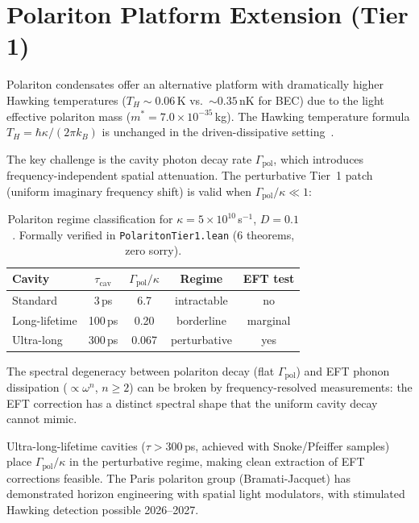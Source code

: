 \documentclass[aps,prd,twocolumn,showpacs,superscriptaddress,nofootinbib]{revtex4-2}
\begin{document}
\section{Polariton Platform Extension (Tier 1)}

Polariton condensates offer an alternative platform with dramatically
higher Hawking temperatures ($T_H \sim 0.06$\,K vs.~$\sim 0.35$\,nK
for BEC) due to the light effective polariton mass
($m^* = 7.0 \times 10^{-35}$\,kg). The Hawking temperature formula
$T_H = \hbar\kappa/(2\pi k_B)$ is unchanged in the driven-dissipative
setting~\cite{Grisins2016}.

The key challenge is the cavity photon decay rate $\Gamma_\text{pol}$,
which introduces frequency-independent spatial attenuation. The
perturbative Tier~1 patch (uniform imaginary frequency shift) is valid
when $\Gamma_\text{pol}/\kappa \ll 1$:

\begin{table}[h]
\caption{Polariton regime classification for $\kappa = 5 \times 10^{10}$\,s$^{-1}$,
$D = 0.1$. Formally verified in \texttt{PolaritonTier1.lean} (6 theorems, zero sorry).}
\label{tab:polariton}
\begin{ruledtabular}
\begin{tabular}{lcccc}
Cavity & $\tau_\text{cav}$ & $\Gamma_\text{pol}/\kappa$ & Regime & EFT test \\
\hline
Standard & 3\,ps & 6.7 & intractable & no \\
Long-lifetime & 100\,ps & 0.20 & borderline & marginal \\
Ultra-long & 300\,ps & 0.067 & perturbative & yes \\
\end{tabular}
\end{ruledtabular}
\end{table}

The spectral degeneracy between polariton decay (flat $\Gamma_\text{pol}$)
and EFT phonon dissipation ($\propto \omega^n$, $n \geq 2$) can be broken
by frequency-resolved measurements: the EFT correction has a distinct
spectral shape that the uniform cavity decay cannot mimic.

Ultra-long-lifetime cavities ($\tau > 300$\,ps, achieved with
Snoke/Pfeiffer samples) place $\Gamma_\text{pol}/\kappa$ in the
perturbative regime, making clean extraction of EFT corrections feasible.
The Paris polariton group (Bramati-Jacquet) has demonstrated horizon
engineering with spatial light modulators, with stimulated Hawking
detection possible 2026--2027.
\end{document}
